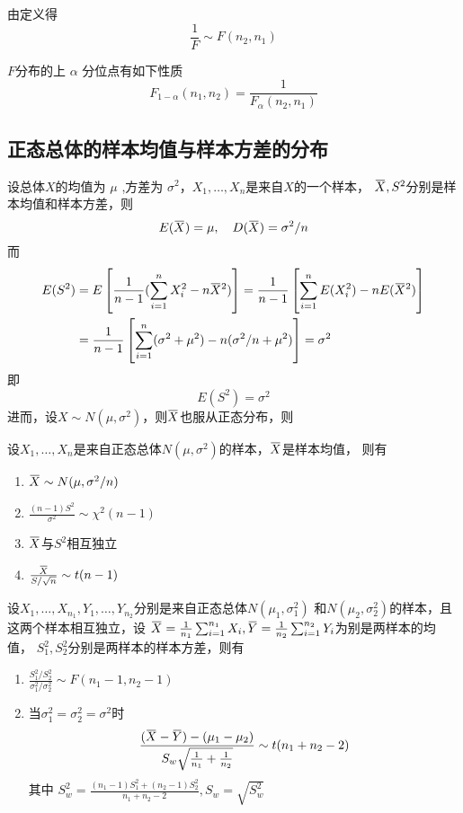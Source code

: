\documentclass[11pt]{article}
\begin{document}
由定义得
\begin{equation*}
\frac{1}{F}\sim F(n_2,n_1)
\end{equation*}


\(F\)分布的上 \(\alpha\) 分位点有如下性质
\begin{equation*}
F_{1-\alpha}(n_1,n_2)=\frac{1}{F_\alpha(n_2,n_1)}
\end{equation*}

\subsection{正态总体的样本均值与样本方差的分布}
\label{sec:org96272bb}
设总体\(X\)的均值为 \(\mu\) ,方差为 \(\sigma^2\)，\(X_1,\dots,X_n\)是来自\(X\)的一个样本，
\(\bbar{X},S^2\)分别是样本均值和样本方差，则
\begin{equation*}
E(\bbar{X})=\mu,\quad D(\bbar{X})=\sigma^2/n
\end{equation*}
而
\begin{align*}
E(S^2)&=E\left[\frac{1}{n-1}(\sum_{i=1}^nX_i^2-n\bbar{X}^2)
\right]=\frac{1}{n-1}\left[\sum_{i=1}^nE(X_i^2)-nE(\bbar{X}^2)
\right]\\
&=\frac{1}{n-1}\left[\sum_{i=1}^n(\sigma^2+\mu^2)-n(\sigma^2/n+\mu^2)
\right]=\sigma^2
\end{align*}
即
\begin{equation*}
E(S^2)=\sigma^2
\end{equation*}
进而，设\(X\sim N(\mu,\sigma^2)\)，则\(\bbar{X}\)也服从正态分布，则
\begin{theorem}[]
\label{thm6.3.3}
设\(X_1,\dots,X_n\)是来自正态总体\(N(\mu,\sigma^2)\)的样本，\(\bbar{X}\)是样本均值，
则有
\begin{enumerate}
\item \(\bbar{X}\sim N(\mu,\sigma^2/n)\)
\item \(\frac{(n-1)S^2}{\sigma^2}\sim\chi^2(n-1)\)
\item \(\bbar{X}\)与\(S^2\)相互独立
\item \(\frac{\bbar{X}}{S/\sqrt{n}}\sim t(n-1)\)
\end{enumerate}
\end{theorem}

\begin{theorem}[]
\label{thm6.3.4}
设\(X_1,\dots,X_{n_1},Y_1,\dots,Y_{n_2}\)分别是来自正态总体\(N(\mu_1,\sigma^2_1)\)
和\(N(\mu_2,\sigma_2^2)\)的样本，且这两个样本相互独立，设
\(\bbar{X}=\frac{1}{n_1}\sum_{i=1}^{n_1}X_i,
   \bbar{Y}=\frac{1}{n_2}\sum_{i=1}^{n_2}Y_i\)为别是两样本的均值，
\(S_1^2,S_2^2\)分别是两样本的样本方差，则有
\begin{enumerate}
\item \(\frac{S_1^2/S_2^2}{\sigma_1^2/\sigma_2^2}\sim F(n_1-1,n_2-1)\)
\item 当\(\sigma_1^2=\sigma_2^2=\sigma^2\)时
\begin{equation*}
\frac{(\bbar{X}-\bbar{Y})-(\mu_1-\mu_2)}{S_w\sqrt{\frac{1}{n_1}+\frac{1}{n_2}}}\sim
t(n_1+n_2-2)
\end{equation*}
其中 \(S_w^2=\frac{(n_1-1)S_1^2+(n_2-1)S_2^2}{n_1+n_2-2},S_w=\sqrt{S_w^2}\)
\end{enumerate}
\end{theorem}
\end{document}
